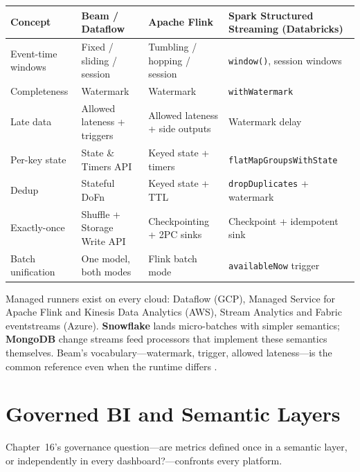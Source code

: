 \begin{center}
\footnotesize
\begin{tabular}{@{}p{2.8cm}p{2.9cm}p{2.9cm}p{3.6cm}@{}}
\toprule
\textbf{Concept} & \textbf{Beam / Dataflow} & \textbf{Apache Flink} & \textbf{Spark Structured Streaming (Databricks)} \\
\midrule
Event-time windows & Fixed / sliding / session & Tumbling / hopping / session & \texttt{window()}, session windows \\
Completeness & Watermark & Watermark & \texttt{withWatermark} \\
Late data & Allowed lateness + triggers & Allowed lateness + side outputs & Watermark delay \\
Per-key state & State \& Timers API & Keyed state + timers & \texttt{flatMapGroupsWithState} \\
Dedup & Stateful DoFn & Keyed state + TTL & \texttt{dropDuplicates} + watermark \\
Exactly-once & Shuffle + Storage Write API & Checkpointing + 2PC sinks & Checkpoint + idempotent sink \\
Batch unification & One model, both modes & Flink batch mode & \texttt{availableNow} trigger \\
\bottomrule
\end{tabular}
\end{center}

\noindent Managed runners exist on every cloud: Dataflow (GCP), Managed Service for Apache Flink
and Kinesis Data Analytics (AWS), Stream Analytics and Fabric eventstreams (Azure).
\textbf{Snowflake} lands micro-batches with simpler semantics; \textbf{MongoDB} change streams feed
processors that implement these semantics themselves. Beam's vocabulary---watermark, trigger,
allowed lateness---is the common reference even when the runtime differs \cite{akidau2015dataflow}.

\section{Governed BI and Semantic Layers}
%
Chapter~16's governance question---are metrics defined once in a semantic layer, or independently
in every dashboard?---confronts every platform.

